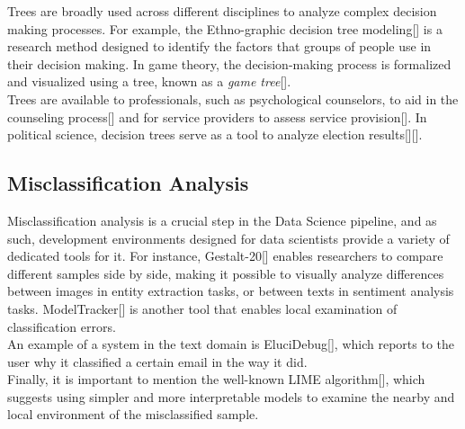 \documentclass[11pt]{article}
\begin{document}
Trees are broadly used across different disciplines to analyze complex decision making processes. For example, the Ethno-graphic decision tree modeling[] is a research method designed to identify the factors that groups of people use in their decision making. In game theory, the decision-making process is formalized and visualized using a tree, known as a \textit{game tree}[].\\
Trees are available to professionals, such as psychological counselors, to aid in the counseling process[] and for service providers to assess service provision[]. In political science, decision trees serve as a tool to analyze election results[][].

\subsection{Misclassification Analysis}\label{Misclassification Analysis
}
Misclassification analysis is a crucial step in the Data Science pipeline, and as such, development environments designed for data scientists provide a variety of dedicated tools for it. For instance, Gestalt-20[] enables researchers to compare different samples side by side, making it possible to visually analyze differences between images in entity extraction tasks, or between texts in sentiment analysis tasks. ModelTracker[] is another tool that enables local examination of classification errors.\\
An example of a system in the text domain is EluciDebug[], which reports to the user why it classified a certain email in the way it did.\\
Finally, it is important to mention the well-known LIME algorithm[], which suggests using simpler and more interpretable models to examine the nearby and local environment of the misclassified sample.
\end{document}
